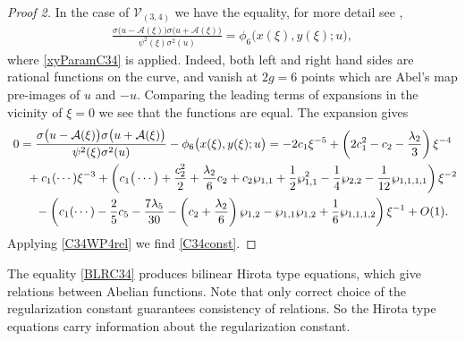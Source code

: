 \begin{proof}[Proof 2]
In the case of $\mathcal{V}_{(3,4)}$ we have the equality, for more detail see \cite{BL2005},
\begin{gather}\label{BLRC34}
 \frac{\sigma\big(u-\mathcal{A}(\xi)\big)\sigma\big(u+\mathcal{A}(\xi)\big)} {\psi^2(\xi)\sigma^2(u)} = \phi_{6}\big(x(\xi),y(\xi);u\big),
\end{gather}
where \eqref{xyParamC34} is applied. Indeed, both left and right hand sides are rational functions on the curve, and vanish at $2g=6$ points which are Abel's map pre-images of $u$ and $-u$. Comparing the leading terms of expansions in the vicinity of $\xi=0$ we see that the functions are equal. The expansion gives
\begin{gather*}
 0= \frac{\sigma\big(u-\mathcal{A}(\xi)\big)\sigma\big(u+\mathcal{A}(\xi)\big)}
 {\psi^2(\xi)\sigma^2(u)} - \phi_{6}\big(x(\xi),y(\xi);u\big)= -2 c_1 \xi^{-5}
 + \left(2c_1^2 - c_2 -\frac{\lambda_2}{3}\right)\xi^{-4}
\\ \hphantom{0=}{} + c_1 (\cdots) \xi^{-3}+
 \left(c_1 \big(\cdots \big) + \frac{c_2^2}{2} + \frac{\lambda_2}{6} c_2 + c_2 \wp_{1,1}
 + \frac{1}{2}\wp_{1,1}^2 -\frac{1}{4}\wp_{2,2} -\frac{1}{12}\wp_{1,1,1,1} \right)\xi^{-2}
 \\ \hphantom{0=}{} - \left(c_1 (\cdots ) - \frac{2}{5}c_5
 -\frac{7\lambda_5}{30} - \left(c_2 + \frac{\lambda_2}{6}\right) \wp_{1,2}
 - \wp_{1,1} \wp_{1,2} + \frac{1}{6}\wp_{1,1,1,2}\right)\xi^{-1} + O(1).
\end{gather*}
Applying \eqref{C34WP4rel} we find \eqref{C34const}.
\end{proof}

\begin{Remark}The equality \eqref{BLRC34} produces bilinear Hirota type equations, which give relations between Abelian functions. Note that
only correct choice of the regularization constant guarantees consistency of relations. So the Hirota type equations carry information about the regularization constant.
\end{Remark}
